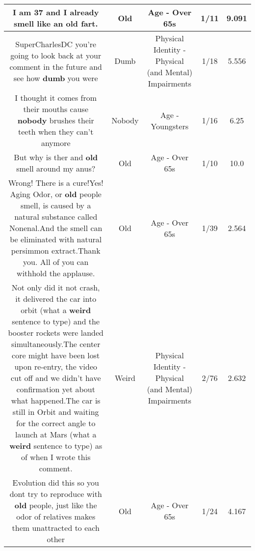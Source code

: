 \documentclass[11pt]{article}
\newlength\mylength
\begin{document}
\begin{center}
\begin{longtable}{|C{.65\mylength}|C{.30\mylength}|C{.12\mylength}|C{.12\mylength}|C{.12\mylength}|}
  \small I am 37 and I already smell like an \textbf{old} fart.\normalsize   & Old & Age - Over 65s & 1/11 & 9.091 \\  \hline
  \small SuperCharlesDC you're going to look back at your comment in the future and see how \textbf{dumb} you were\normalsize   & Dumb & Physical Identity - Physical (and Mental) Impairments & 1/18 & 5.556 \\  \hline
  \small I thought it comes from their mouths cause \textbf{nobody} brushes their teeth when they can't anymore\normalsize   & Nobody & Age - Youngsters & 1/16 & 6.25 \\  \hline
  \small But why is ther and \textbf{old} smell around my anus?\normalsize   & Old & Age - Over 65s & 1/10 & 10.0 \\  \hline
  \small Wrong! There is a cure!Yes! Aging Odor, or \textbf{old} people smell, is caused by a natural substance called Nonenal.And the smell can be eliminated with natural persimmon extract.Thank you. All of you can withhold the applause.\normalsize   & Old & Age - Over 65s & 1/39 & 2.564 \\  \hline
  \small Not only did it not crash, it delivered the car into orbit (what a \textbf{weird} sentence to type) and the booster rockets were landed simultaneously.The center core might have been lost upon re-entry, the video cut off and we didn't have confirmation yet about what happened.The car is still in Orbit and waiting for the correct angle to launch at Mars (what a \textbf{weird} sentence to type) as of when I wrote this comment.\normalsize   & Weird & Physical Identity - Physical (and Mental) Impairments & 2/76 & 2.632 \\  \hline
  \small Evolution did this so you dont try to reproduce with \textbf{old} people, just like the odor of relatives makes them unattracted to each other\normalsize   & Old & Age - Over 65s & 1/24 & 4.167 \\  \hline

\end{longtable}
\end{center}
\end{document}
